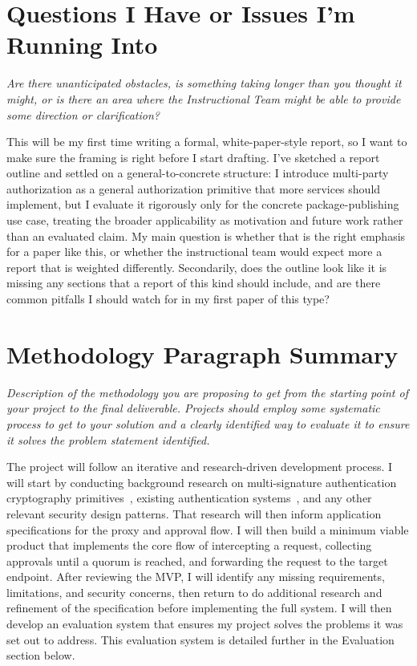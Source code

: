\documentclass[12pt]{article}
\newcommand{\instruction}[1]{{\small\itshape #1}}
\begin{document}
\section*{Questions I Have or Issues I'm Running Into}

\instruction{Are there unanticipated obstacles, is something taking longer than you thought it might, or is there an area where the Instructional Team might be able to provide some direction or clarification?}

This will be my first time writing a formal, white-paper-style report, so I want to make sure the framing is right before I start drafting. I've sketched a report outline and settled on a general-to-concrete structure: I introduce multi-party authorization as a general authorization primitive that more services should implement, but I evaluate it rigorously only for the concrete package-publishing use case, treating the broader applicability as motivation and future work rather than an evaluated claim. My main question is whether that is the right emphasis for a paper like this, or whether the instructional team would expect more a report that is weighted differently. Secondarily, does the outline look like it is missing any sections that a report of this kind should include, and are there common pitfalls I should watch for in my first paper of this type?

\section*{Methodology Paragraph Summary}

\instruction{Description of the methodology you are proposing to get from the starting point of your project to the final deliverable. Projects should employ some systematic process to get to your solution and a clearly identified way to evaluate it to ensure it solves the problem statement identified.}

The project will follow an iterative and research-driven development process. I will start by conducting background research on multi-signature authentication cryptography primitives~\cite{shamir-secret-sharing,frost,musig2,gg18,gg20,dkls18,dkls19,mpc-expander-graph}, existing authentication systems~\cite{authelia}, and any other relevant security design patterns. That research will then inform application specifications for the proxy and approval flow. I will then build a minimum viable product that implements the core flow of intercepting a request, collecting approvals until a quorum is reached, and forwarding the request to the target endpoint. After reviewing the MVP, I will identify any missing requirements, limitations, and security concerns, then return to do additional research and refinement of the specification before implementing the full system. I will then develop an evaluation system that ensures my project solves the problems it was set out to address. This evaluation system is detailed further in the Evaluation section below.
\end{document}
